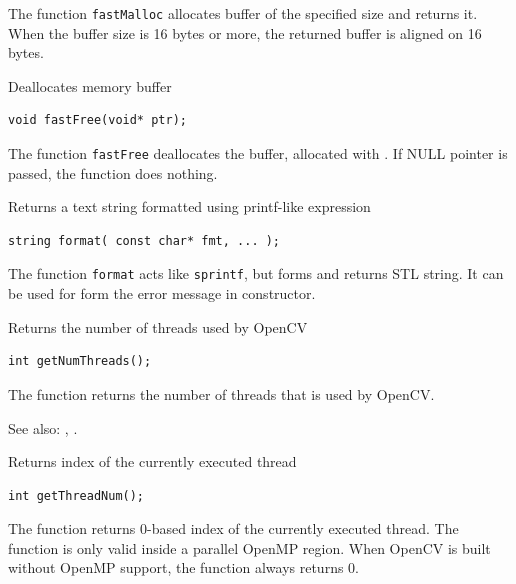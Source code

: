 The function \texttt{fastMalloc} allocates buffer of the specified size and returns it. When the buffer size is 16 bytes or more, the returned buffer is aligned on 16 bytes.

\label{fastFree}
Deallocates memory buffer

\begin{lstlisting}
void fastFree(void* ptr);
\end{lstlisting}
\begin{description}
\end{description}

The function \texttt{fastFree} deallocates the buffer, allocated with .
If NULL pointer is passed, the function does nothing.

\label{format}
Returns a text string formatted using printf-like expression

\begin{lstlisting}
string format( const char* fmt, ... );
\end{lstlisting}
\begin{description}
\end{description}

The function \texttt{format} acts like \texttt{sprintf}, but forms and returns STL string. It can be used for form the error message in  constructor.

\label{getNumThreads}
Returns the number of threads used by OpenCV

\begin{lstlisting}
int getNumThreads();
\end{lstlisting}

The function returns the number of threads that is used by OpenCV.

See also: , .


\label{getThreadNum}
Returns index of the currently executed thread

\begin{lstlisting}
int getThreadNum();
\end{lstlisting}

The function returns 0-based index of the currently executed thread. The function is only valid inside a parallel OpenMP region. When OpenCV is built without OpenMP support, the function always returns 0.

